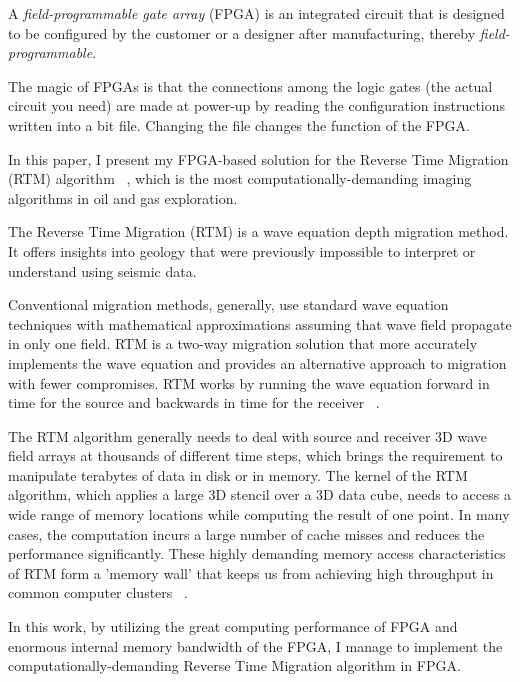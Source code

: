 A \emph {field-programmable gate array} (FPGA) is an integrated
circuit that is designed to be configured by the customer or a designer
after manufacturing, thereby \emph {field-programmable.}

The magic of FPGAs is that the connections among the logic gates (the
actual circuit you need) are made at power-up by reading the configuration
instructions written into a bit file. Changing the file changes the
function of the FPGA.

In this paper, I present my FPGA-based solution for the Reverse Time
Migration (RTM) algorithm ~\cite{yoon03}, which is the most computationally-demanding
imaging algorithms in oil and gas exploration.

The Reverse Time Migration (RTM) is a wave equation depth migration
method. It offers insights into geology that were previously impossible
to interpret or understand using seismic data.

Conventional migration methods, generally, use standard wave equation
techniques with mathematical approximations assuming that wave field
propagate in only one field. RTM is a two-way migration solution that
more accurately implements the wave equation and provides an alternative
approach to migration with fewer compromises. RTM works by running
the wave equation forward in time for the source and backwards in
time for the receiver ~\cite{shafiq}.

The RTM algorithm generally needs to deal with source and receiver
3D wave field arrays at thousands of different time steps, which brings
the requirement to manipulate terabytes of data in disk or in memory.
The kernel of the RTM algorithm, which applies a large 3D stencil
over a 3D data cube, needs to access a wide range of memory locations
while computing the result of one point. In many cases, the computation
incurs a large number of cache misses and reduces the performance
significantly. These highly demanding memory access characteristics
of RTM form a 'memory wall' that keeps us from achieving high throughput
in common computer clusters ~\cite{fu11}.

In this work, by utilizing the great computing performance of FPGA
and enormous internal memory bandwidth of the FPGA, I manage to implement
the computationally-demanding Reverse Time Migration algorithm in
FPGA.
